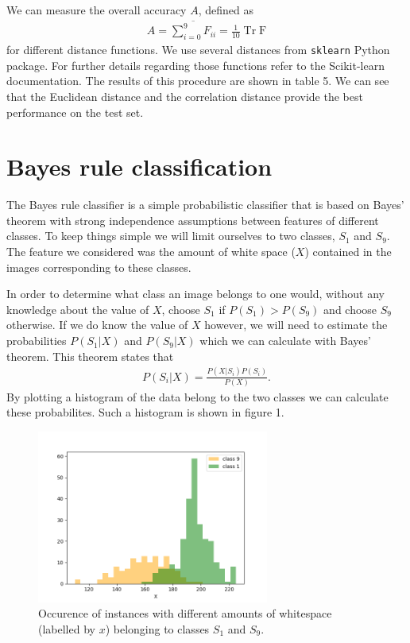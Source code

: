 \documentclass[11pt]{article}
\DeclareMathOperator{\Tr}{Tr}
\begin{document}
We can measure the overall accuracy $A$, defined as
\begin{align}
A=\overline{\sum_{i=0}^9F_{ii}}=\frac{1}{10}\Tr\mathrm{F}
\end{align}
for different distance functions. We use several distances from \verb|sklearn| Python package. For further details regarding those functions refer to the Scikit-learn documentation\cite{scikit}. The results of this procedure are shown in table 5. We can see that the Euclidean distance and the correlation distance provide the best performance on the test set.
\section{Bayes rule classification}
The Bayes rule classifier is a simple probabilistic classifier that is based on Bayes' theorem with strong independence assumptions between features of different classes. To keep things simple we will limit ourselves to two classes, $S_1$ and $S_9$. The feature we considered was the amount of white space ($X$) contained in the images corresponding to these classes.\par
In order to determine what class an image belongs to one would, without any knowledge about the value of $X$, choose $S_1$ if $P(S_1)>P(S_9)$ and choose $S_9$ otherwise. If we do know the value of $X$ however, we will need to estimate the probabilities $P(S_1|X)$ and $P(S_9|X)$ which we can calculate with Bayes' theorem. This theorem states that
\begin{align}
P(S_i|X)=\frac{P(X|S_i)P(S_i)}{P(X)}.
\end{align}
By plotting a histogram of the data belong to the two classes we can calculate these probabilites. Such a histogram is shown in figure 1.
\begin{figure}[!b]
\centering
\includegraphics[width=0.68\textwidth]{histogram1_9.png}
\caption{Occurence of instances with different amounts of whitespace (labelled by $x$) belonging to classes $S_1$ and $S_9$.}
\end{figure}
\end{document}
